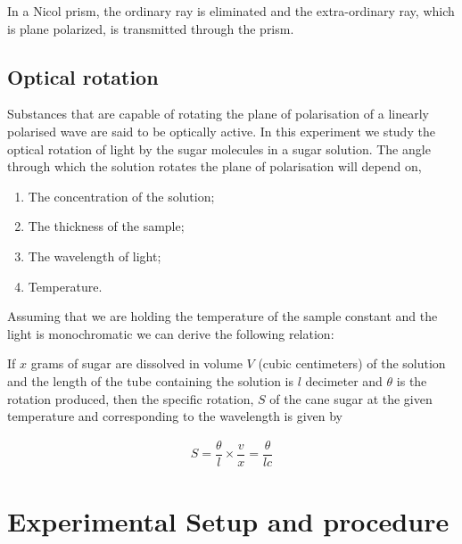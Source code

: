 \documentclass{dkpinto-report}
\begin{document}
In a Nicol prism, the ordinary ray is eliminated and the extra-ordinary ray, which is plane polarized, is transmitted through the prism.

\subsection{Optical rotation}
Substances that are capable of rotating the plane of polarisation of a linearly polarised wave are said to be optically active. In this experiment we study the optical rotation of light by the sugar molecules in a sugar solution. The angle through which the solution rotates the plane of polarisation will depend on,

\begin{enumerate}
\item The concentration of the solution;
\item The thickness of the sample;
\item The wavelength of light; 
\item Temperature.
\end{enumerate}
Assuming that we are holding the temperature of the sample constant and the light is monochromatic we can derive the following relation:

If $x$ grams of sugar are dissolved in volume $V$ (cubic centimeters) of the solution and the length of the tube containing the solution is $l$ decimeter and $\theta$ is the rotation produced, then the specific rotation, $S$ of the cane sugar at the  given temperature and corresponding to the wavelength  is given by 

\begin{align*}
S  = \dfrac{\theta}{l} \times \dfrac{v}{x}  = \dfrac{\theta}{lc}
\end{align*}


\section{Experimental Setup and procedure}
\end{document}
